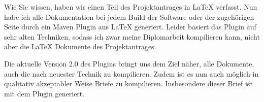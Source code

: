 \documentclass[english,german,a4paper,fontsize=10pt,version=last]{scrlttr2}
\begin{document}
\newcommand{\AdressatFirma}{CapMini GmbH}
\newcommand{\AdressatTitel}{}
\newcommand{\AdressatVorname}{Egon}
\newcommand{\AdressatNachname}{Walther}
\newcommand{\AdressatAnschriftStrasse}{Walthershofener Straße 20}
\newcommand{\AdressatAnschriftPLZOrt}{88444 Walthershofen}

\begin{letter}{\Anschrift} 
  \opening{\Anrede}

  Wie Sie wissen, haben wir einen Teil des Projektantrages in \LaTeX{} verfasst. 
  Nun habe ich alle Dokumentation bei jedem \foreignlanguage{english}{Build} 
  der Software oder der zugehörigen Seite durch ein \foreignlanguage{english}{Maven Plugin} aus \LaTeX{} generiert. 
  Leider basiert das \foreignlanguage{english}{Plugin} auf sehr alten Techniken, 
  sodass ich zwar meine Diplomarbeit kompilieren kann, 
  nicht aber die \LaTeX{} Dokumente des Projektantrages. 

  Die aktuelle Version 2.0 des Plugins bringt uns dem Ziel näher, 
  alle Dokumente, auch die nach neuester Technik zu kompilieren. 
  Zudem ist es nun auch möglich in qualitativ akzeptabler Weise 
  Briefe zu kompilieren. 
  Insbesondere dieser Brief ist mit dem Plugin generiert. 
  


  \closing{\Grussworte \\[2\baselineskip]}

\end{letter}

%
\end{document}
